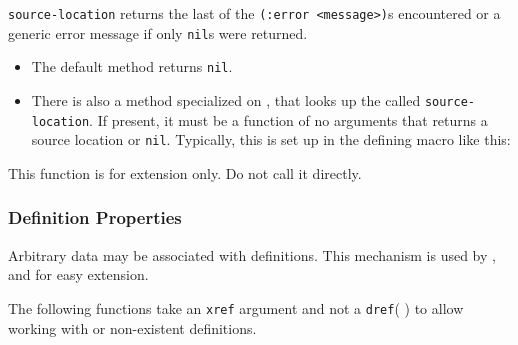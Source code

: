 \begin{itemize}
  \texttt{source-location} returns the last of the
  \texttt{(:error\ \textless{}message\textgreater{})}s encountered or a
  generic error message if only \texttt{nil}s were returned.

  \begin{itemize}
  \item
    The default method returns \texttt{nil}.
  \item
    There is also a method specialized on
    , that
    looks up the
    called \texttt{source-location}. If present, it must be a function
    of no arguments that returns a source location or \texttt{nil}.
    Typically, this is set up in the defining macro like this:

\begin{Shaded}
\begin{Highlighting}[]
\NormalTok{(}\NormalTok{)}
\end{Highlighting}
\end{Shaded}
  \end{itemize}

  This function is for extension only. Do not call it directly.
\end{itemize}

\subsubsection{Definition Properties}\label{definition-properties}

\label{x-28DREF-EXT-3A-40DEFINITION-PROPERTIES-20MGL-PAX-3ASECTION-29}

Arbitrary data may be associated with definitions. This mechanism is
used by
,
and
for easy extension.

The following functions take an \texttt{xref} argument and not a
\texttt{dref}(
) to allow working
with
or non-existent definitions.

